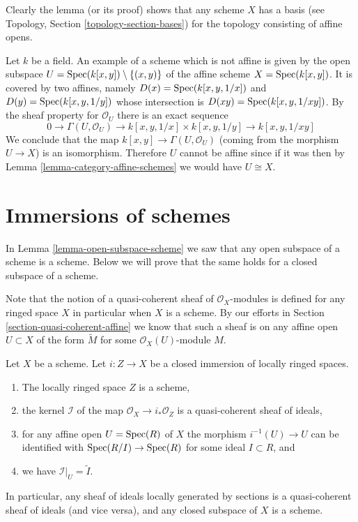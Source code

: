 \noindent
Clearly the lemma (or its proof) shows that any scheme
$X$ has a basis (see Topology, Section \ref{topology-section-bases})
for the topology consisting of affine opens.

\begin{example}
\label{example-not-affine}
Let $k$ be a field.
An example of a scheme which is not affine is
given by the open subspace
$U = \mathop{\mathrm{Spec}}(k[x, y]) \setminus \{ (x, y)\}$
of the affine scheme $X =\mathop{\mathrm{Spec}}(k[x, y])$.
It is covered by two affines, namely $D(x) = \mathop{\mathrm{Spec}}(k[x, y, 1/x])$
and $D(y) = \mathop{\mathrm{Spec}}(k[x, y, 1/y])$ whose intersection is
$D(xy) = \mathop{\mathrm{Spec}}(k[x, y, 1/xy])$. By the sheaf property
for $\mathcal{O}_U$ there is an exact sequence
$$
0 \to
\Gamma(U, \mathcal{O}_U) \to
k[x, y, 1/x] \times k[x, y, 1/y] \to
k[x, y, 1/xy]
$$
We conclude that the map $k[x, y] \to \Gamma(U, \mathcal{O}_U)$
(coming from the morphism $U \to X$) is an isomorphism.
Therefore $U$ cannot be affine since if it was then by
Lemma \ref{lemma-category-affine-schemes} we would have $U \cong X$.
\end{example}











\section{Immersions of schemes}
\label{section-immersions}

\noindent
In Lemma \ref{lemma-open-subspace-scheme} we saw that any open subspace
of a scheme is a scheme. Below we will prove that the same holds for
a closed subspace of a scheme.

\medskip\noindent
Note that the notion of a quasi-coherent sheaf of $\mathcal{O}_X$-modules
is defined for any ringed space $X$ in particular when $X$ is a scheme.
By our efforts in Section \ref{section-quasi-coherent-affine} we
know that such a sheaf is on any affine open $U \subset X$
of the form $\widetilde M$ for some $\mathcal{O}_X(U)$-module $M$.

\begin{lemma}
\label{lemma-closed-subspace-scheme}
Let $X$ be a scheme. Let $i : Z \to X$ be a closed immersion
of locally ringed spaces.
\begin{enumerate}
\item The locally ringed space $Z$ is a scheme,
\item the kernel $\mathcal{I}$ of the map
$\mathcal{O}_X \to i_*\mathcal{O}_Z$ is a quasi-coherent
sheaf of ideals,
\item for any affine open $U = \mathop{\mathrm{Spec}}(R)$ of $X$
the morphism $i^{-1}(U) \to U$ can be identified with
$\mathop{\mathrm{Spec}}(R/I) \to \mathop{\mathrm{Spec}}(R)$ for some ideal $I \subset R$, and
\item we have $\mathcal{I}|_U = \widetilde I$.
\end{enumerate}
In particular, any sheaf of ideals locally generated by sections
is a quasi-coherent sheaf of ideals (and vice versa),
and any closed subspace of $X$ is a scheme.
\end{lemma}


